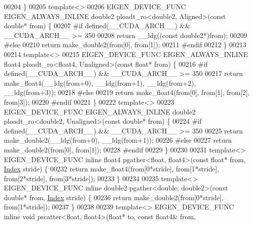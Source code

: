 \begin{DoxyCode}
00204 \}
00205 \textcolor{keyword}{template}<>
00206 EIGEN\_DEVICE\_FUNC EIGEN\_ALWAYS\_INLINE double2 ploadt\_ro<double2, Aligned>(\textcolor{keyword}{const} \textcolor{keywordtype}{double}* from) \{
00207 \textcolor{preprocessor}{#if defined(\_\_CUDA\_ARCH\_\_) && \_\_CUDA\_ARCH\_\_ >= 350}
00208   \textcolor{keywordflow}{return} \_\_ldg((\textcolor{keyword}{const} double2*)from);
00209 \textcolor{preprocessor}{#else}
00210   \textcolor{keywordflow}{return} make\_double2(from[0], from[1]);
00211 \textcolor{preprocessor}{#endif}
00212 \}
00213 
00214 \textcolor{keyword}{template}<>
00215 EIGEN\_DEVICE\_FUNC EIGEN\_ALWAYS\_INLINE float4 ploadt\_ro<float4, Unaligned>(\textcolor{keyword}{const} \textcolor{keywordtype}{float}* from) \{
00216 \textcolor{preprocessor}{#if defined(\_\_CUDA\_ARCH\_\_) && \_\_CUDA\_ARCH\_\_ >= 350}
00217   \textcolor{keywordflow}{return} make\_float4(\_\_ldg(from+0), \_\_ldg(from+1), \_\_ldg(from+2), \_\_ldg(from+3));
00218 \textcolor{preprocessor}{#else}
00219   \textcolor{keywordflow}{return} make\_float4(from[0], from[1], from[2], from[3]);
00220 \textcolor{preprocessor}{#endif}
00221 \}
00222 \textcolor{keyword}{template}<>
00223 EIGEN\_DEVICE\_FUNC EIGEN\_ALWAYS\_INLINE double2 ploadt\_ro<double2, Unaligned>(\textcolor{keyword}{const} \textcolor{keywordtype}{double}* from) \{
00224 \textcolor{preprocessor}{#if defined(\_\_CUDA\_ARCH\_\_) && \_\_CUDA\_ARCH\_\_ >= 350}
00225   \textcolor{keywordflow}{return} make\_double2(\_\_ldg(from+0), \_\_ldg(from+1));
00226 \textcolor{preprocessor}{#else}
00227   \textcolor{keywordflow}{return} make\_double2(from[0], from[1]);
00228 \textcolor{preprocessor}{#endif}
00229 \}
00230 
00231 \textcolor{keyword}{template}<> EIGEN\_DEVICE\_FUNC \textcolor{keyword}{inline} float4 pgather<float, float4>(\textcolor{keyword}{const} \textcolor{keywordtype}{float}* from, 
      \hyperlink{namespace_eigen_a62e77e0933482dafde8fe197d9a2cfde}{Index} stride) \{
00232   \textcolor{keywordflow}{return} make\_float4(from[0*stride], from[1*stride], from[2*stride], from[3*stride]);
00233 \}
00234 
00235 \textcolor{keyword}{template}<> EIGEN\_DEVICE\_FUNC \textcolor{keyword}{inline} double2 pgather<double, double2>(\textcolor{keyword}{const} \textcolor{keywordtype}{double}* from, 
      \hyperlink{namespace_eigen_a62e77e0933482dafde8fe197d9a2cfde}{Index} stride) \{
00236   \textcolor{keywordflow}{return} make\_double2(from[0*stride], from[1*stride]);
00237 \}
00238 
00239 \textcolor{keyword}{template}<> EIGEN\_DEVICE\_FUNC \textcolor{keyword}{inline} \textcolor{keywordtype}{void} pscatter<float, float4>(\textcolor{keywordtype}{float}* to, \textcolor{keyword}{const} float4& from, 

\end{DoxyCode}
